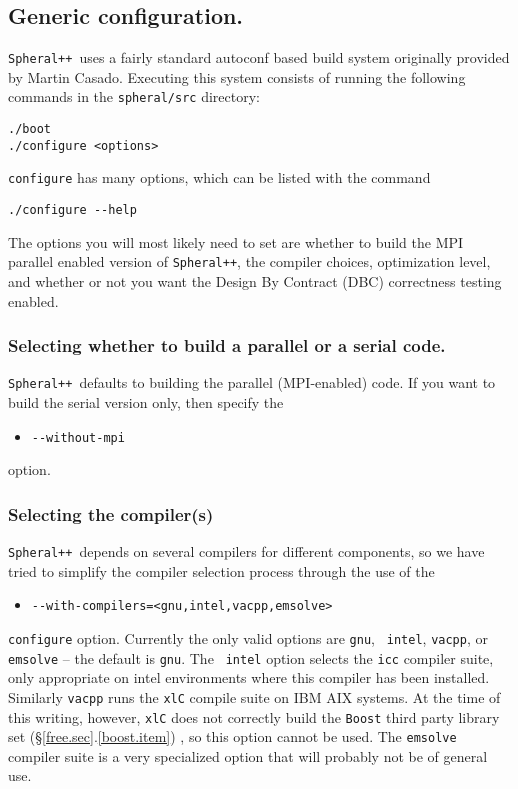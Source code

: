 \documentclass{article}
\newcommand{\Spheral}{{\tt Spheral++}}
\begin{document}
\subsection{Generic configuration.}
\Spheral\ uses a fairly standard autoconf based build system originally
provided by Martin Casado.  Executing this system consists of running the
following commands in the {\tt spheral/src} directory:
\begin{verbatim}
./boot
./configure <options>
\end{verbatim}
{\tt configure} has many options, which can be listed with the command
\begin{verbatim}
./configure --help
\end{verbatim}
The options you will most likely need to set are whether to build the MPI
parallel enabled version of \Spheral, the compiler choices, optimization level,
and whether or not you want the Design By Contract (DBC) correctness testing
enabled.

\subsubsection{Selecting whether to build a parallel or a serial code.}
\Spheral\ defaults to building the parallel (MPI-enabled) code.  If you want to
build the serial version only, then specify the
\begin{itemize}
\item\verb+--without-mpi+
\end{itemize}
option.

\subsubsection{Selecting the compiler(s)}
\Spheral\ depends on several compilers for different components, so we have
tried to simplify the compiler selection process through the use of the
\begin{itemize}
\item \verb+--with-compilers=<gnu,intel,vacpp,emsolve>+
\end{itemize}
{\tt configure} option.  Currently the only valid options are {\tt gnu}, {\tt
  intel}, {\tt vacpp}, or {\tt emsolve} -- the default is {\tt gnu}.  The {\tt
  intel} option selects the {\tt icc} compiler suite, only appropriate on intel
environments where this compiler has been installed.  Similarly {\tt vacpp} runs
the {\tt xlC} compile suite on IBM AIX systems.  At the time of this writing,
however, {\tt xlC} does not correctly build the {\tt Boost} third party library
set (\S \ref{free.sec}.\ref{boost.item}) , so this option cannot be used.  The
{\tt emsolve} compiler suite is a very specialized option that will probably not
be of general use.
\end{document}
